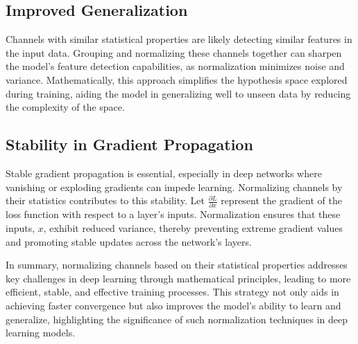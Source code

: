 \subsection{Improved Generalization}
Channels with similar statistical properties are likely detecting similar features in the input data. Grouping and normalizing these channels together can sharpen the model's feature detection capabilities, as normalization minimizes noise and variance. Mathematically, this approach simplifies the hypothesis space explored during training, aiding the model in generalizing well to unseen data by reducing the complexity of the space.

\subsection{Stability in Gradient Propagation}
Stable gradient propagation is essential, especially in deep networks where vanishing or exploding gradients can impede learning. Normalizing channels by their statistics contributes to this stability. Let \(\frac{\partial L}{\partial x}\) represent the gradient of the loss function with respect to a layer's inputs. Normalization ensures that these inputs, \(x\), exhibit reduced variance, thereby preventing extreme gradient values and promoting stable updates across the network's layers.

In summary, normalizing channels based on their statistical properties addresses key challenges in deep learning through mathematical principles, leading to more efficient, stable, and effective training processes. This strategy not only aids in achieving faster convergence but also improves the model's ability to learn and generalize, highlighting the significance of such normalization techniques in deep learning models.
